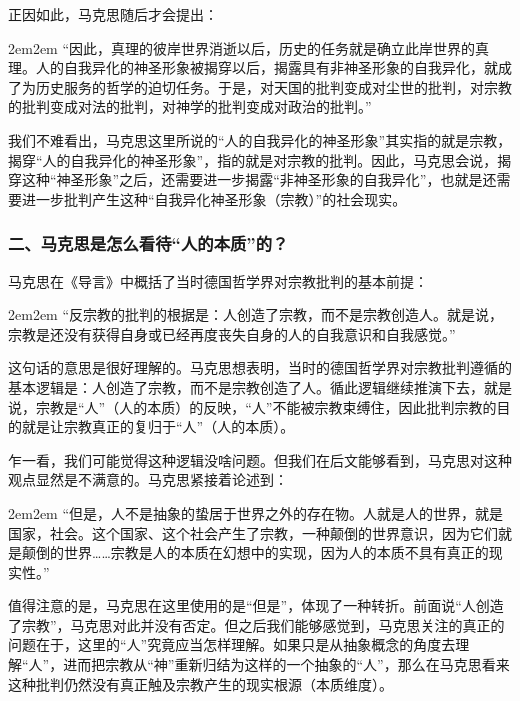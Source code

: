 \documentclass[a4paper,twoside,12pt,AutoFakeBold]{ctexart}
\begin{document}
正因如此，马克思随后才会提出：

\begin{adjustwidth}{2em}{2em}
\qquad\fangsong
“因此，真理的彼岸世界消逝以后，历史的任务就是确立此岸世界的真理。人的自我异化的神圣形象被揭穿以后，揭露具有非神圣形象的自我异化，就成了为历史服务的哲学的迫切任务。于是，对天国的批判变成对尘世的批判，对宗教的批判变成对法的批判，对神学的批判变成对政治的批判。”
\end{adjustwidth}

我们不难看出，马克思这里所说的“人的自我异化的神圣形象”其实指的就是宗教，揭穿“人的自我异化的神圣形象”，指的就是对宗教的批判。因此，马克思会说，揭穿这种“神圣形象”之后，还需要进一步揭露“非神圣形象的自我异化”，也就是还需要进一步批判产生这种“自我异化神圣形象（宗教）”的社会现实。

\subsubsection{二、马克思是怎么看待“人的本质”的？}

马克思在《导言》中概括了当时德国哲学界对宗教批判的基本前提：

\begin{adjustwidth}{2em}{2em}
\qquad\fangsong
“反宗教的批判的根据是：人创造了宗教，而不是宗教创造人。就是说，宗教是还没有获得自身或已经再度丧失自身的人的自我意识和自我感觉。”
\end{adjustwidth}

这句话的意思是很好理解的。马克思想表明，当时的德国哲学界对宗教批判遵循的基本逻辑是：人创造了宗教，而不是宗教创造了人。循此逻辑继续推演下去，就是说，宗教是“人”（人的本质）的反映，“人”不能被宗教束缚住，因此批判宗教的目的就是让宗教真正的复归于“人”（人的本质）。

乍一看，我们可能觉得这种逻辑没啥问题。但我们在后文能够看到，马克思对这种观点显然是不满意的。马克思紧接着论述到：

\begin{adjustwidth}{2em}{2em}
\qquad\fangsong
“但是，人不是抽象的蛰居于世界之外的存在物。人就是人的世界，就是国家，社会。这个国家、这个社会产生了宗教，一种颠倒的世界意识，因为它们就是颠倒的世界……宗教是人的本质在幻想中的实现，因为人的本质不具有真正的现实性。”
\end{adjustwidth}

值得注意的是，马克思在这里使用的是“但是”，体现了一种转折。前面说“人创造了宗教”，马克思对此并没有否定。但之后我们能够感觉到，马克思关注的真正的问题在于，这里的“人”究竟应当怎样理解。如果只是从抽象概念的角度去理解“人”，进而把宗教从“神”重新归结为这样的一个抽象的“人”，那么在马克思看来这种批判仍然没有真正触及宗教产生的现实根源（本质维度）。
\end{document}
